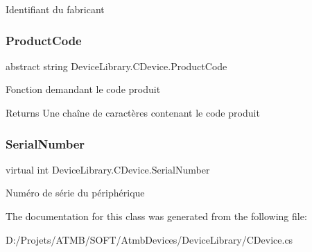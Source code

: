 Identifiant du fabricant 

\mbox{\label{class_device_library_1_1_c_device_adb37480555a37555da8fc17c73196fda}} 
\subsubsection{\texorpdfstring{Product\+Code}{ProductCode}}
{\footnotesize\ttfamily abstract string Device\+Library.\+C\+Device.\+Product\+Code\hspace{0.3cm}{\ttfamily [get]}}



Fonction demandant le code produit 

\begin{DoxyReturn}{Returns}
Une chaîne de caractères contenant le code produit
\end{DoxyReturn}
\mbox{\label{class_device_library_1_1_c_device_a5d542b0634e0024751d1e6df6975e0b8}} 
\subsubsection{\texorpdfstring{Serial\+Number}{SerialNumber}}
{\footnotesize\ttfamily virtual int Device\+Library.\+C\+Device.\+Serial\+Number\hspace{0.3cm}{\ttfamily [get]}}



Numéro de série du périphérique 



The documentation for this class was generated from the following file\+:\begin{DoxyCompactItemize}
\item 
D\+:/\+Projets/\+A\+T\+M\+B/\+S\+O\+F\+T/\+Atmb\+Devices/\+Device\+Library/C\+Device.\+cs\end{DoxyCompactItemize}
